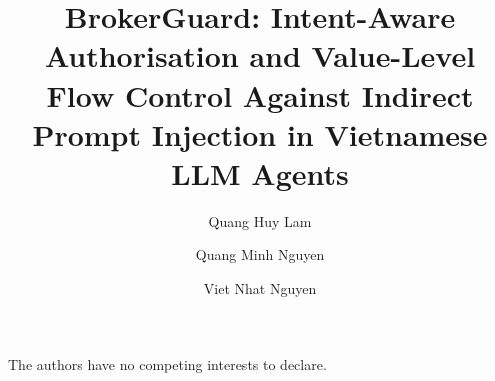 \documentclass[runningheads]{llncs}
\begin{document}
\title{BrokerGuard: Intent-Aware Authorisation and Value-Level Flow Control Against Indirect Prompt Injection in
Vietnamese LLM Agents}

\author{Quang Huy Lam \and Quang Minh Nguyen \and Viet Nhat Nguyen}

\maketitle













\begin{credits}
\subsubsection{\discintname} The authors have no competing interests to declare.
\end{credits}



\end{document}
